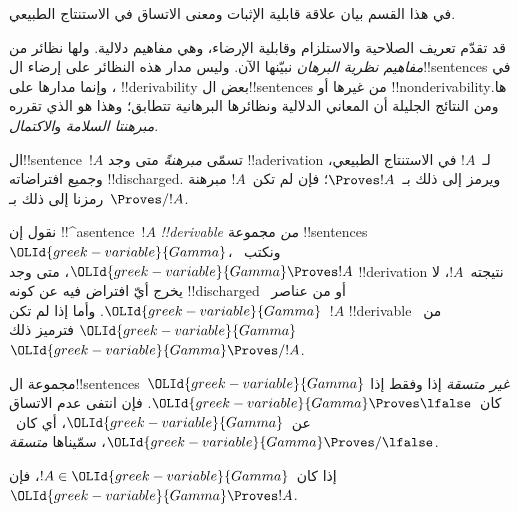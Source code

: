 \documentclass[../../../include/open-logic-section]{subfiles}
\begin{document}
      {}
      {}


\begin{editorial}
في هذا القسم بيان علاقة قابلية الإثبات ومعنى الاتساق في الاستنتاج
الطبيعي.
\end{editorial}

\begin{explain}
قد تقدّم تعريف الصلاحية والاستلزام وقابلية الإرضاء، وهي مفاهيم دلالية.
ولها نظائر من \emph{مفاهيم نظرية البرهان} نبيّنها الآن. وليس مدار هذه
النظائر على إرضاء ال!!{sentence}s في
، وإنما مدارها على
!!{derivability} بعض ال!!{sentence}s من غيرها أو !!{nonderivability}ها.
ومن النتائج الجليلة أن المعاني الدلالية ونظائرها البرهانية تتطابق؛
وهذا هو الذي تقرره \emph{مبرهنتا السلامة} و\emph{الاكتمال}.
\end{explain}


\begin{defn}[المبرهنات]
ال!!{sentence}~$!A$ تسمّى \emph{مبرهنةً} متى وجد !!a{derivation} لـ~$!A$
في الاستنتاج الطبيعي، وجميع افتراضاته !!{discharged}. ويرمز إلى ذلك
بـ~$\Proves !A$؛ فإن لم تكن~$!A$ مبرهنة رمزنا إلى ذلك بـ~$\Proves/ !A$.
\end{defn}

\begin{defn}[!!^{derivability}]
نقول إن !!^a{sentence}~$!A$ \emph{!!{derivable} من} مجموعة
!!{sentence}s~${\OLId{greek-variable}{Gamma}}$، ونكتب~${\OLId{greek-variable}{Gamma}} \Proves !A$، متى وجد
!!{derivation} نتيجته~$!A$، لا يخرج أيّ افتراض فيه عن كونه
!!{discharged} أو من عناصر~${\OLId{greek-variable}{Gamma}}$. وأما إذا لم تكن~$!A$
!!{derivable} من~${\OLId{greek-variable}{Gamma}}$ فترميز ذلك~${\OLId{greek-variable}{Gamma}} \Proves/ !A$.
\end{defn}

\begin{defn}[الاتساق]
مجموعة ال!!{sentence}s~${\OLId{greek-variable}{Gamma}}$ \emph{غير متسقة} إذا وفقط إذا
كان~${\OLId{greek-variable}{Gamma}} \Proves \lfalse$. فإن انتفى عدم الاتساق عن~${\OLId{greek-variable}{Gamma}}$،
أي كان~${\OLId{greek-variable}{Gamma}} \Proves/ \lfalse$، سمّيناها \emph{متسقة}.
\end{defn}

\begin{prop}[الانعكاسية]
إذا كان~$!A \in {\OLId{greek-variable}{Gamma}}$، فإن~${\OLId{greek-variable}{Gamma}} \Proves !A$.
\end{prop}
\end{document}
